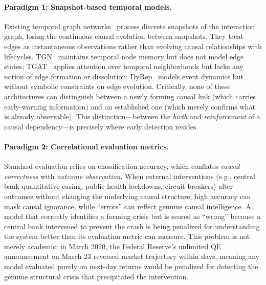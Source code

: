 \documentclass[11pt]{article}
\begin{document}
\paragraph{Paradigm 1: Snapshot-based temporal models.} Existing temporal graph networks~\citep{rossi2020tgn,xu2020tgat,trivedi2019dyrep,cong2023graphmixer} process discrete snapshots of the interaction graph, losing the continuous causal evolution between snapshots. They treat edges as instantaneous observations rather than evolving causal relationships with lifecycles. TGN~\citep{rossi2020tgn} maintains temporal node memory but does not model edge states; TGAT~\citep{xu2020tgat} applies attention over temporal neighborhoods but lacks any notion of edge formation or dissolution; DyRep~\citep{trivedi2019dyrep} models event dynamics but without symbolic constraints on edge evolution. Critically, none of these architectures can distinguish between a newly forming causal link (which carries early-warning information) and an established one (which merely confirms what is already observable). This distinction---between the \emph{birth} and \emph{reinforcement} of a causal dependency---is precisely where early detection resides.

\paragraph{Paradigm 2: Correlational evaluation metrics.} Standard evaluation relies on classification accuracy, which conflates \emph{causal correctness} with \emph{outcome observation}. When external interventions (e.g., central bank quantitative easing, public health lockdowns, circuit breakers) alter outcomes without changing the underlying causal structure, high accuracy can mask causal ignorance, while ``errors'' can reflect genuine causal intelligence. A model that correctly identifies a forming crisis but is scored as ``wrong'' because a central bank intervened to prevent the crash is being penalized for understanding the system better than its evaluation metric can measure. This problem is not merely academic: in March 2020, the Federal Reserve's unlimited QE announcement on March 23 reversed market trajectory within days, meaning any model evaluated purely on next-day returns would be penalized for detecting the genuine structural crisis that precipitated the intervention.
\end{document}
